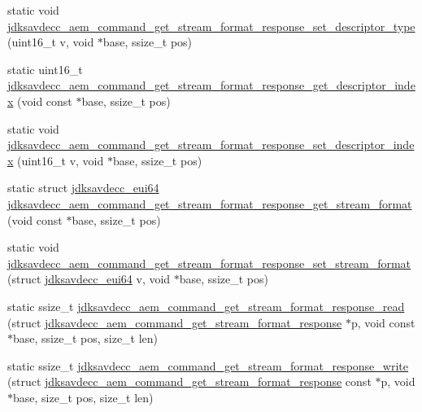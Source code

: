 \begin{DoxyCompactItemize}
static void \hyperlink{group__command__get__stream__format__response_ga3d2bedcefa545b4183f8c3547e18d697}{jdksavdecc\+\_\+aem\+\_\+command\+\_\+get\+\_\+stream\+\_\+format\+\_\+response\+\_\+set\+\_\+descriptor\+\_\+type} (uint16\+\_\+t v, void $\ast$base, ssize\+\_\+t pos)
\item 
static uint16\+\_\+t \hyperlink{group__command__get__stream__format__response_ga7563eab7dd358577f64f660404bed6c9}{jdksavdecc\+\_\+aem\+\_\+command\+\_\+get\+\_\+stream\+\_\+format\+\_\+response\+\_\+get\+\_\+descriptor\+\_\+index} (void const $\ast$base, ssize\+\_\+t pos)
\item 
static void \hyperlink{group__command__get__stream__format__response_ga493426fe93520e2ee927e5759fa7fbb6}{jdksavdecc\+\_\+aem\+\_\+command\+\_\+get\+\_\+stream\+\_\+format\+\_\+response\+\_\+set\+\_\+descriptor\+\_\+index} (uint16\+\_\+t v, void $\ast$base, ssize\+\_\+t pos)
\item 
static struct \hyperlink{structjdksavdecc__eui64}{jdksavdecc\+\_\+eui64} \hyperlink{group__command__get__stream__format__response_gaa2b8003ea4005a05570f417601ec000a}{jdksavdecc\+\_\+aem\+\_\+command\+\_\+get\+\_\+stream\+\_\+format\+\_\+response\+\_\+get\+\_\+stream\+\_\+format} (void const $\ast$base, ssize\+\_\+t pos)
\item 
static void \hyperlink{group__command__get__stream__format__response_ga09f8a652337aaaec780a4b196c40cb55}{jdksavdecc\+\_\+aem\+\_\+command\+\_\+get\+\_\+stream\+\_\+format\+\_\+response\+\_\+set\+\_\+stream\+\_\+format} (struct \hyperlink{structjdksavdecc__eui64}{jdksavdecc\+\_\+eui64} v, void $\ast$base, ssize\+\_\+t pos)
\item 
static ssize\+\_\+t \hyperlink{group__command__get__stream__format__response_ga5276f0e7a55c3e8acacbd787d2e1cef1}{jdksavdecc\+\_\+aem\+\_\+command\+\_\+get\+\_\+stream\+\_\+format\+\_\+response\+\_\+read} (struct \hyperlink{structjdksavdecc__aem__command__get__stream__format__response}{jdksavdecc\+\_\+aem\+\_\+command\+\_\+get\+\_\+stream\+\_\+format\+\_\+response} $\ast$p, void const $\ast$base, ssize\+\_\+t pos, size\+\_\+t len)
\item 
static ssize\+\_\+t \hyperlink{group__command__get__stream__format__response_gac3019b6187e734fea41b6d7bce291c4d}{jdksavdecc\+\_\+aem\+\_\+command\+\_\+get\+\_\+stream\+\_\+format\+\_\+response\+\_\+write} (struct \hyperlink{structjdksavdecc__aem__command__get__stream__format__response}{jdksavdecc\+\_\+aem\+\_\+command\+\_\+get\+\_\+stream\+\_\+format\+\_\+response} const $\ast$p, void $\ast$base, size\+\_\+t pos, size\+\_\+t len)
\end{DoxyCompactItemize}


